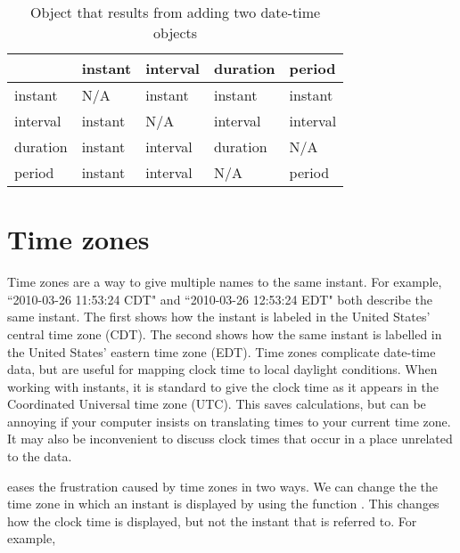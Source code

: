 \documentclass[article]{jss}
\begin{document}
\begin{table}
  \begin{center}
  \begin{tabular}{l|llll}
  & instant & interval & duration & period\\
  \hline
  instant & N/A & instant & instant & instant\\
  interval & instant & N/A & interval & interval\\
  duration & instant & interval & duration & N/A\\
  period & instant & interval & N/A & period\\
  \hline
    
  \end{tabular}
  \end{center}
  \caption{Object that results from adding two date-time objects}
  \label{tbl:date-math}
\end{table}

\section{Time zones}
\label{sec:tz}

Time zones are a way to give multiple names to the same instant. For example, ``2010-03-26 11:53:24 CDT" and ``2010-03-26 12:53:24 EDT" both describe the same instant. The first shows how the instant is labeled in the United States' central time zone (CDT). The second shows how the same instant is labelled in the United States' eastern time zone (EDT). Time zones complicate date-time data, but are useful for mapping clock time to local daylight conditions. When working with instants, it is standard to give the clock time as it appears in the Coordinated Universal time zone (UTC).  This saves calculations, but can be annoying if your computer insists on translating times to your current time zone.  It may also be inconvenient to discuss clock times that occur in a place unrelated to the data.

 eases the frustration caused by time zones in two ways. We can change the the time zone in which an instant is displayed by using the function . This changes how the clock time is displayed, but not the instant that is referred to. For example,\\

\\
\\
\\
\\
\end{document}
